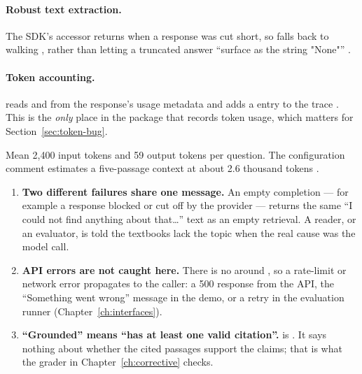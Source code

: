 \paragraph{Robust text extraction.} The SDK's  accessor returns  when a response was cut short, so  falls back to walking , rather than letting a truncated answer \enquote{surface as the string "None"} .

\paragraph{Token accounting.}  reads  and  from the response's usage metadata and adds a  entry to the trace . This is the \emph{only} place in the package that records token usage, which matters for Section~\ref{sec:token-bug}.

\begin{verified}
Mean 2,400 input tokens and 59 output tokens per question. The configuration comment estimates a five-passage context at about 2.6 thousand tokens .
\end{verified}

\begin{inferred}
\begin{enumerate}
  \item \textbf{Two different failures share one message.} An empty completion --- for example a response blocked or cut off by the provider --- returns the same \enquote{I could not find anything about that\ldots} text as an empty retrieval. A reader, or an evaluator, is told the textbooks lack the topic when the real cause was the model call.
  \item \textbf{API errors are not caught here.} There is no  around , so a rate-limit or network error propagates to the caller: a 500 response from the API, the \enquote{Something went wrong} message in the demo, or a retry in the evaluation runner (Chapter~\ref{ch:interfaces}).
  \item \textbf{\enquote{Grounded} means \enquote{has at least one valid citation}.}  is . It says nothing about whether the cited passages support the claims; that is what the grader in Chapter~\ref{ch:corrective} checks.
\end{enumerate}
\end{inferred}

